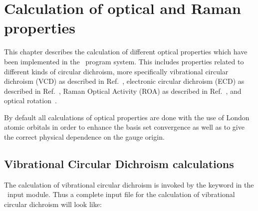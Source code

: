 \chapter{Calculation of optical and Raman properties}\label{ch:optchap}

This chapter describes the calculation of different optical
properties which have been implemented in the \siraba\ program system.
This includes properties related to different kinds of circular
dichroism, more specifically vibrational circular dichroism
(VCD) as 
described in Ref.~\cite{klbpjthkrhjajjcp98}, electronic circular
dichroism (ECD) as
described in Ref.~\cite{klbaehkrthjopjtca90}, Raman 
Optical Activity (ROA) as
described in Ref.~\cite{thkrklbpjjofd99}, and optical rotation~\cite{plpmp91,plpdkckrcpl319}.

By default all calculations of optical properties are done with
the use of London atomic orbitals in order to
enhance the basis set 
convergence as well as to give the correct physical dependence on the
gauge origin. 

\section{Vibrational Circular Dichroism calculations}

\begin{center}
\end{center}

The calculation of vibrational circular
dichroism is invoked
by the 
keyword  in the \aba\ input module. Thus a complete
input file for the calculation of vibrational circular dichroism will
look like:


